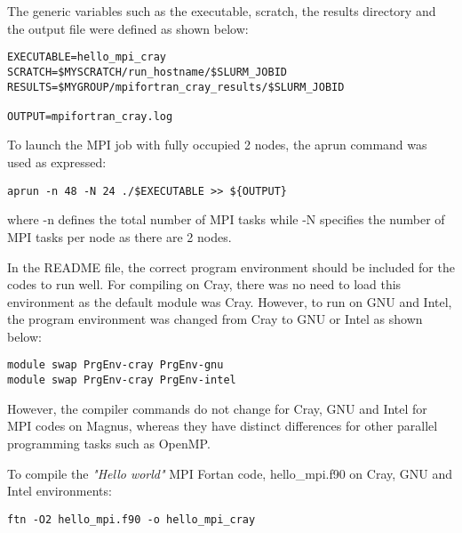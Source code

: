 The generic variables such as the executable, scratch, the results directory and the output file were defined as shown below:

\begin{tcolorbox}
\begin{Verbatim}[fontsize=\scriptsize]
EXECUTABLE=hello_mpi_cray
SCRATCH=$MYSCRATCH/run_hostname/$SLURM_JOBID
RESULTS=$MYGROUP/mpifortran_cray_results/$SLURM_JOBID

OUTPUT=mpifortran_cray.log 
\end{Verbatim}
\end{tcolorbox}

To launch the MPI job with fully occupied 2 nodes, the aprun command was used as expressed:

\begin{tcolorbox}
\begin{Verbatim}[fontsize=\scriptsize]
aprun -n 48 -N 24 ./$EXECUTABLE >> ${OUTPUT}
\end{Verbatim}
\end{tcolorbox}

where -n defines the total number of MPI tasks while -N specifies the number of MPI tasks per node as there are 2 nodes.

In the README file, the correct program environment should be included for the codes to run well. For compiling on Cray, there was no need to load
this environment as the default module was Cray. However, to run on GNU and Intel, the program environment was changed from Cray to GNU or Intel as
shown below:

\begin{tcolorbox}
\begin{Verbatim}[fontsize=\scriptsize]
module swap PrgEnv-cray PrgEnv-gnu
module swap PrgEnv-cray PrgEnv-intel
\end{Verbatim}
\end{tcolorbox}

However, the compiler commands do not change for Cray, GNU and Intel for MPI codes on Magnus, whereas they have distinct differences for other parallel
programming tasks such as OpenMP.

To compile the \emph{"Hello world"} MPI Fortan code, hello\_mpi.f90 on Cray, GNU and Intel environments:

\begin{tcolorbox}
\begin{Verbatim}[fontsize=\scriptsize]
ftn -O2 hello_mpi.f90 -o hello_mpi_cray
\end{Verbatim}
\end{tcolorbox}

